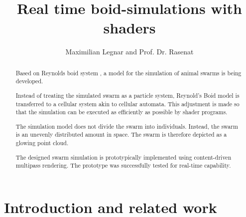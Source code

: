 \documentclass[a4paper, 10pt, journal]{wissarbIEEE}      %
\title{\LARGE \bf
Real time boid-simulations with shaders
}
\author{Maximilian Legnar and Prof. Dr. Rasenat}%
\begin{document}
\maketitle

\begin{abstract}

%
%
%

Based on Reynolds boid system \cite{Reynolds87flocks}, a model for the simulation of animal swarms is being developed. 

Instead of treating the simulated swarm as a particle system, Reynold's Boid model is transferred to a cellular system akin to cellular automata. This adjustment is made so that the simulation can be executed as efficiently as possible by shader programs. 

The simulation model does not divide the swarm into individuals. Instead, the swarm is an unevenly distributed amount in space. The swarm is therefore depicted as a glowing point cloud. 

The designed swarm simulation is prototypically implemented using content-driven multipass rendering. The prototype was successfully tested for real-time capability.


\end{abstract}

\section{Introduction and related work}
\end{document}
